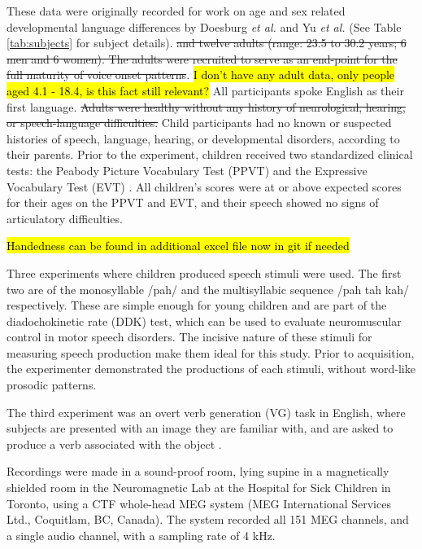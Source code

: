 \documentclass[a4paper]{article}
\newcommand{\DK}[1]{{\small \textcolor{blue}{\hl{#1}}}}
\begin{document}
These data were originally recorded for work on age and sex related developmental language differences by Doesburg \emph{et al.} and Yu \emph{et al.} \cite{Doesburg2016, Yu2014} (See Table \ref{tab:subjects} for subject details). \st{and twelve adults (range: 23.5 to 30.2 years; 6 men and 6 women). The adults were recruited to serve as an end-point for the full maturity of voice onset patterns}. \DK{I don't have any adult data, only people aged 4.1 - 18.4, is this fact still relevant?} All participants spoke English as their first language. \st{Adults were healthy without any history of neurological, hearing, or speech-language difficulties.} Child participants had no known or suspected histories of speech, language, hearing, or developmental disorders, according to their parents. Prior to the experiment, children received two standardized clinical tests: the Peabody Picture Vocabulary Test (PPVT) \cite{Dunn97} and the Expressive Vocabulary Test (EVT) \cite{EVT}. All children's scores were at or above expected scores for their ages on the PPVT and EVT, and their speech showed no signs of articulatory difficulties.

\DK{Handedness can be found in additional excel file now in git if needed}

Three experiments where children produced speech stimuli were used. The first two are of the monosyllable /pah/ and the multisyllabic sequence /pah tah kah/ respectively. These are simple enough for young children and are part of the diadochokinetic rate (DDK) test, which can be used to evaluate neuromuscular control in motor speech disorders. The incisive nature of these stimuli for measuring speech production make them ideal for this study. Prior to acquisition, the experimenter demonstrated the productions of each stimuli, without word-like prosodic patterns.

The third experiment was an overt verb generation (VG) task in English, where subjects are presented with an image they are familiar with, and are asked to produce a verb associated with the object \cite{Doesburg2016}.

Recordings were made in a sound-proof room, lying supine in a magnetically shielded room in the Neuromagnetic Lab at the Hospital for Sick Children in Toronto, using a CTF whole-head MEG system (MEG International Services Ltd., Coquitlam, BC, Canada). The system recorded all 151 MEG channels, and a single audio channel, with a sampling rate of 4 kHz. %
\end{document}
